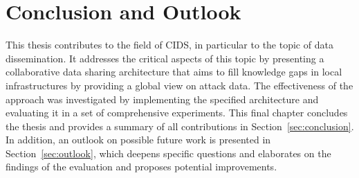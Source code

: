 \documentclass[../../main.tex]{subfiles}
\begin{document}
\chapter{Conclusion and Outlook}\label{ch:conclusion}

This thesis contributes to the field of CIDS, in particular to the topic of data dissemination. It addresses the critical aspects of this topic by presenting a collaborative data sharing architecture that aims to fill knowledge gaps in local infrastructures by providing a global view on attack data. The effectiveness of the approach was investigated by implementing the specified architecture and evaluating it in a set of comprehensive experiments. This final chapter concludes the thesis and provides a summary of all contributions in Section~\ref{sec:conclusion}. In addition, an outlook on possible future work is presented in Section~\ref{sec:outlook}, which deepens specific questions and elaborates on the findings of the evaluation and proposes potential improvements.
\newpage
\end{document}
